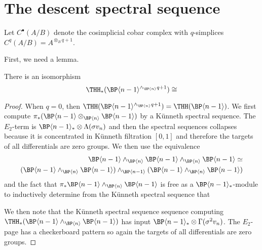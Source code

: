 \section{The descent spectral sequence}

\begin{definition}
Let $C^{\bullet}(A/B)$ denote the cosimplicial cobar complex with $q$-simplices $C^{q}(A/B)=A^{\otimes_{B}q+1}$.
\end{definition}

First, we need a lemma. 

\begin{lemma}
There is an isomorphism 
\[ \THH_{*}(\BP\langle n-1\rangle^{\wedge_{\BP\langle n\rangle}q+1})\cong \]
\end{lemma}
\begin{proof}
When $q=0$, then $\THH(\BP\langle n-1\rangle^{\wedge_{\BP\langle n\rangle}q+1})=\THH(\BP\langle n-1\rangle)$. 
We first compute 
$\pi_{*}(\BP\langle n-1\rangle\otimes_{\BP\langle n\rangle}\BP\langle n-1\rangle)$
by a K\"unneth spectral sequence. The $E_{2}$-term is $\BP\langle n-1\rangle_{*}\otimes \Lambda (\sigma v_{n})$ and then the spectral sequences collapses because it is concentrated in K\"unneth filtration $[0,1]$ and therefore the targets of all differentials are zero groups. We then use the equivalence 
\begin{align*}
\BP\langle n-1\rangle\wedge_{\BP\langle n\rangle}\BP\langle n-1\rangle\wedge_{\BP\langle n\rangle}\BP\langle n-1\rangle\simeq  \\
(\BP\langle n-1\rangle\wedge_{\BP\langle n\rangle}\BP\langle n-1\rangle)\wedge_{\BP\langle n-1\rangle}(\BP\langle n-1\rangle  \wedge_{\BP\langle n\rangle}\BP\langle n-1\rangle)
\end{align*}
and the fact that $\pi_{*}\BP\langle n-1\rangle\wedge_{\BP\langle n\rangle}\BP\langle n-1\rangle$ is free as a $\BP\langle n-1\rangle_{*}$-module to inductively determine from the K\"unneth spectral sequence that 

We then note that the K\"unneth spectral sequence sequence computing $\THH_{*}(\BP\langle n-1\rangle\wedge_{\BP\langle n\rangle}\BP\langle n-1\rangle)$ has input $\BP\langle n-1\rangle_{*}\otimes \Gamma (\sigma^{2} v_{n})$. The $E_{2}$-page has a checkerboard pattern so again the targets of all differentials are zero groups. 
\end{proof}

